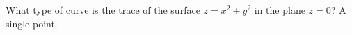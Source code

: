 {What type of curve is the trace of the surface $z=x^2+y^2$ in the plane $z=0$?
}
{A single point.
}

